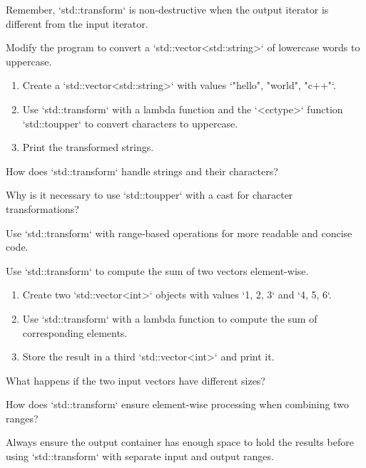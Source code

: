 \begin{challenge}
    \begin{advice}
        Remember, `std::transform` is non-destructive when the output iterator is different from the input iterator.
    \end{advice}

    \begin{task}
    Modify the program to convert a `std::vector<std::string>` of lowercase words to uppercase.
    \begin{enumerate}
        \item Create a `std::vector<std::string>` with values `{"hello", "world", "c++"}`.
        \item Use `std::transform` with a lambda function and the `<cctype>` function `std::toupper` to convert characters to uppercase.
        \item Print the transformed strings.
    \end{enumerate}
    \begin{questions}
        \item How does `std::transform` handle strings and their characters?
        \item Why is it necessary to use `std::toupper` with a cast for character transformations?
    \end{questions}
    \end{task}

    \begin{advice}
        Use `std::transform` with range-based operations for more readable and concise code.
    \end{advice}

    \begin{task}
    Use `std::transform` to compute the sum of two vectors element-wise.
    \begin{enumerate}
        \item Create two `std::vector<int>` objects with values `{1, 2, 3}` and `{4, 5, 6}`.
        \item Use `std::transform` with a lambda function to compute the sum of corresponding elements.
        \item Store the result in a third `std::vector<int>` and print it.
    \end{enumerate}
    \begin{questions}
        \item What happens if the two input vectors have different sizes?
        \item How does `std::transform` ensure element-wise processing when combining two ranges?
    \end{questions}
    \end{task}

    \begin{advice}
        Always ensure the output container has enough space to hold the results before using `std::transform` with separate input and output ranges.
    \end{advice}

\end{challenge}
